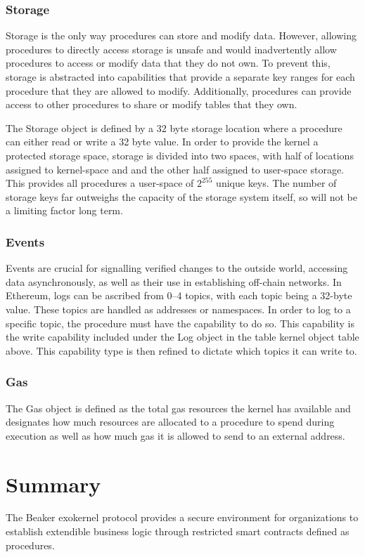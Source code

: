 \documentclass[english,a4paper]{article}
\let\oldparagraph\subsubsection
\renewcommand{\subsubsection}[1]{\oldparagraph{#1}\mbox{}}
\begin{document}
\subsubsection{Storage}\label{storage}
Storage is the only way procedures can store and modify data. However,
allowing procedures to directly access storage is unsafe and would
inadvertently allow procedures to access or modify data that they do not
own. To prevent this, storage is abstracted into capabilities that
provide a separate key ranges for each procedure that they are allowed
to modify. Additionally, procedures can provide access to other
procedures to share or modify tables that they own.

The Storage object is defined by a 32 byte storage location where a
procedure can either read or write a 32 byte value. In order to provide
the kernel a protected storage space, storage is divided into two
spaces, with half of locations assigned to kernel-space and and the
other half assigned to user-space storage. This provides all procedures a
user-space of $2^{255}$ unique keys. The number of storage keys far outweighs
the capacity of the storage system itself, so will not be a limiting
factor long term.

\subsubsection{Events}\label{events}
Events are crucial for signalling verified changes to the outside world,
accessing data asynchronously, as well as their use in establishing
off-chain networks. In Ethereum, logs can be ascribed from 0–4 topics,
with each topic being a 32-byte value. These topics are handled as
addresses or namespaces. In order to log to a specific topic, the
procedure must have the capability to do so. This capability is the
write capability included under the Log object in the table kernel
object table above. This capability type is then refined to dictate
which topics it can write to.

\subsubsection{Gas}\label{gas}
The Gas object is defined as the total gas resources the kernel has
available and designates how much resources are allocated to a procedure
to spend during execution as well as how much gas it is allowed to send
to an external address.

\section{Summary}\label{summary}
The Beaker exokernel protocol provides a secure environment for
organizations to establish extendible business logic through restricted
smart contracts defined as procedures.
\end{document}
